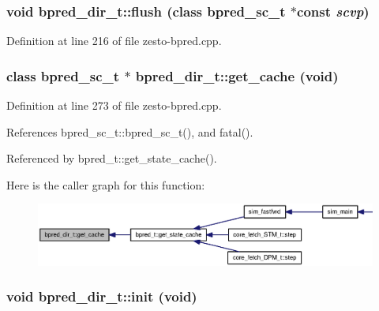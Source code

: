 \subsubsection[{flush}]{\setlength{\rightskip}{0pt plus 5cm}void bpred\_\-dir\_\-t::flush (class {\bf bpred\_\-sc\_\-t} $\ast$const  {\em scvp})\hspace{0.3cm}{\tt  [virtual]}}\label{classbpred__dir__t_7ab8f00f12623bef37493663d2626954}




Definition at line 216 of file zesto-bpred.cpp.
\subsubsection[{get\_\-cache}]{\setlength{\rightskip}{0pt plus 5cm}class {\bf bpred\_\-sc\_\-t} $\ast$ bpred\_\-dir\_\-t::get\_\-cache (void)\hspace{0.3cm}{\tt  [virtual]}}\label{classbpred__dir__t_0b63c3ce792598d30615dc412dfec66c}




Definition at line 273 of file zesto-bpred.cpp.

References bpred\_\-sc\_\-t::bpred\_\-sc\_\-t(), and fatal().

Referenced by bpred\_\-t::get\_\-state\_\-cache().

Here is the caller graph for this function:\nopagebreak
\begin{figure}[H]
\begin{center}
\leavevmode
\includegraphics[width=324pt]{classbpred__dir__t_0b63c3ce792598d30615dc412dfec66c_icgraph}
\end{center}
\end{figure}
\subsubsection[{init}]{\setlength{\rightskip}{0pt plus 5cm}void bpred\_\-dir\_\-t::init (void)\hspace{0.3cm}{\tt  [protected]}}\label{classbpred__dir__t_d705e0919d6c44fbecbb22d0cb9b4472}




